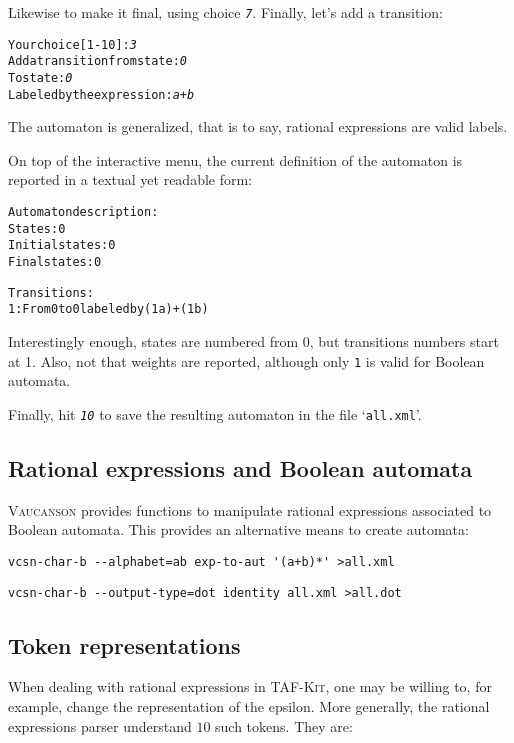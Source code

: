 \documentclass[a4paper]{report}
\newenvironment{shell}
{\begin{alltt}}
{\end{alltt}}
\newcommand\kbd[1]{\textsl{\texttt{#1}}}
\newcommand\file[1]{`\texttt{#1}'}
\newcommand\code[1]{\texttt{#1}}
\newcommand{\tafkit}{\textsc{TAF-Kit}\xspace}
\newcommand{\Vauc}{\textsc{Vaucanson}\xspace}
\newcommand{\withweighttt}[2]{\symbol{`\{}#1\symbol{`\}} #2}
\begin{document}
Likewise to make it final, using choice \kbd{7}.  Finally, let's add a
transition:

\begin{shell}
Your choice [1-10]: \kbd{3}
  Add a transition from state: \kbd{0}
  To state: \kbd{0}
  Labeled by the expression: \kbd{a+b}
\end{shell}

\noindent
The automaton is generalized, that is to say, rational expressions are
valid labels.

On top of the interactive menu, the current definition of the
automaton is reported in a textual yet readable form:

\begin{shell}
Automaton description:
  States: 0
  Initial states: 0
  Final states: 0

  Transitions:
    1: From 0 to 0 labeled by (\withweighttt{1}{a})+(\withweighttt{1}{b})
\end{shell}

\noindent
Interestingly enough, states are numbered from 0, but transitions
numbers start at 1.  Also, not that weights are reported, although
only \code{1} is valid for Boolean automata.

Finally, hit \kbd{10} to save the resulting automaton in the file
\file{all.xml}.

\subsection{Rational expressions and Boolean automata}

\Vauc provides functions to manipulate rational expressions associated
to Boolean automata.  This provides an alternative means to create
automata:

\begin{verbatim}
vcsn-char-b --alphabet=ab exp-to-aut '(a+b)*' >all.xml
\end{verbatim}
\begin{verbatim}
vcsn-char-b --output-type=dot identity all.xml >all.dot
\end{verbatim}

\subsection{Token representations}

When dealing with rational expressions in \tafkit, one may be willing to,
for example, change the representation of the epsilon. More generally,
the rational expressions parser understand $10$ such tokens. They are:
\end{document}
